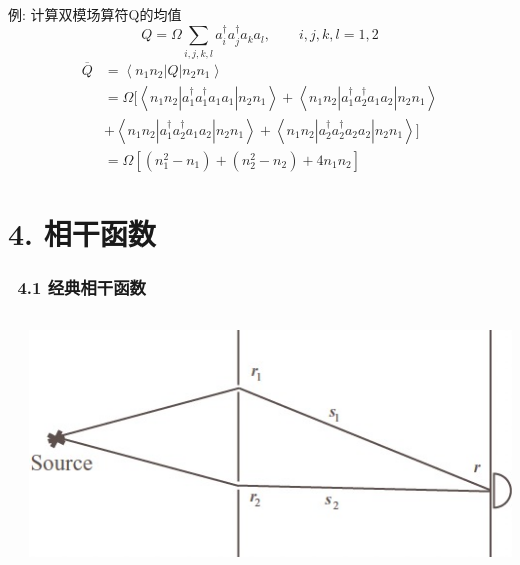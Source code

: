 \begin{frame} 
 \frametitle{}
   例: 计算双模场算符Q的均值
   \[  Q= \Omega \sum_{i,j,k,l} a^{\dagger} _i a^{\dagger} _j a_k a_l, \qquad i,j,k,l =1,2 \]
   \[ \begin{aligned}
       \overline{Q}&= \left\langle n_1 n_2|Q|n_2n_1  \right\rangle \\
       &= \Omega[\left\langle n_1 n_2|a^{\dagger} _1 a^{\dagger} _1 a_1 a_1|n_2n_1  \right\rangle + \left\langle n_1 n_2|a^{\dagger} _1 a^{\dagger} _2 a_1 a_2|n_2n_1  \right\rangle \\ 
       & + \left\langle n_1 n_2|a^{\dagger} _1 a^{\dagger} _2 a_1 a_2|n_2n_1  \right\rangle  
       + \left\langle n_1 n_2|a^{\dagger} _2 a^{\dagger} _2 a_2 a_2|n_2n_1  \right\rangle]  \\
       &= \Omega [(n_1 ^2 -n_1) + (n_2 ^2 -n_2) +4n_1 n_2 ]
   \end{aligned}\]    
\end{frame}

\section{4. 相干函数}

\begin{frame} 
\frametitle{~4.1 经典相干函数}
     \begin{columns}
         \begin{column}[t]{0.69\linewidth}
      
         \end{column}
         \begin{column}[t]{0.3\linewidth} 
               \begin{center}
                    \includegraphics[width=1.0\textwidth]{figs/2022-06-02-14-02-17.png} 
               \end{center} 
         \end{column} 
     \end{columns} 
\end{frame}

